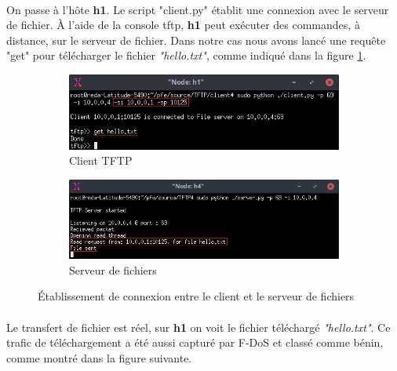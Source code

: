 \paragraph{}
On passe à l'hôte \textbf{h1}. Le script "client.py" établit une connexion avec le serveur de fichier. À l'aide de la console tftp, \textbf{h1} peut exécuter des commandes,  à distance, sur le serveur de fichier. Dans notre cas nous avons lancé une requête "get" pour télécharger le fichier \textit{"hello.txt"}, comme indiqué dans la figure \ref{fig:c/s_TFTP}.

\begin{figure}[h]
\centering
\begin{subfigure}{12.5cm}
\centering
\includegraphics[width=\textwidth]{Figures/simulation/mininet/TFTP/client/benign}
\caption{Client TFTP}
\end{subfigure}
\vskip 0.4cm
\begin{subfigure}{12.5cm}
\centering
\includegraphics[width=\textwidth]{Figures/simulation/mininet/TFTP/server/benign_request}
\caption{Serveur de fichiers}
\end{subfigure}
\vskip 0.3cm
\decoRule
\caption{Établissement de connexion entre le client et le serveur de fichiers}
\label{fig:c/s_TFTP}
\end{figure}
\paragraph{}
Le transfert de fichier est réel, sur \textbf{h1} on voit le fichier téléchargé \textit{"hello.txt"}. Ce trafic de téléchargement a été aussi capturé par F-DoS et classé comme bénin, comme montré dans la figure suivante.

